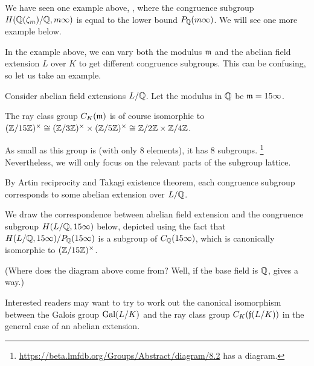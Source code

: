 We have seen one example above, , where the congruence subgroup
$H(\mathbb Q(\zeta_m)/\mathbb Q, m \infty)$ is equal to the lower bound $P_\mathbb Q(m \infty)$.
We will see one more example below.

\begin{example}
	In the example above, we can vary both the modulus $\mathfrak m$ and the abelian field extension $L$
	over $K$ to get different congruence subgroups.
	This can be confusing, so let us take an example.

	Consider abelian field extensions $L/\mathbb Q$. Let the modulus in $\mathbb Q$ be $\mathfrak m = 15 \infty$.

	The ray class group $C_K(\mathfrak m)$ is of course isomorphic to $(\mathbb Z/15\mathbb Z)^\times \cong (\mathbb Z/3\mathbb Z)^\times \times (\mathbb Z/5\mathbb Z)^\times
	\cong \mathbb Z/2\mathbb Z \times \mathbb Z/4\mathbb Z$.

	As small as this group is (with only 8 elements), it has 8 subgroups.%
	\footnote{\url{https://beta.lmfdb.org/Groups/Abstract/diagram/8.2} has a diagram.}
	Nevertheless, we will only focus on the relevant parts of the subgroup lattice.

	By Artin reciprocity and Takagi existence theorem, each congruence subgroup corresponds to
	some abelian extension over $L/\mathbb Q$.

	We draw the correspondence between abelian field extension and the congruence subgroup
	$H(L/\mathbb Q, 15 \infty)$ below, depicted using the fact that
	$H(L/\mathbb Q, 15 \infty)/P_\mathbb Q(15 \infty)$ is a subgroup of $C_\mathbb Q(15 \infty)$,
	which is canonically isomorphic to $(\mathbb Z/15\mathbb Z)^\times$.
	\begin{center}
	\end{center}
	(Where does the diagram above come from? Well, if the base field is $\mathbb Q$,
	 gives a way.)

	Interested readers may want to try to work out the canonical isomorphism between the Galois
	group $\operatorname{Gal}(L/K)$ and the ray class group $C_K(\mathfrak f(L/K))$
	in the general case of an abelian extension.


\end{example}
